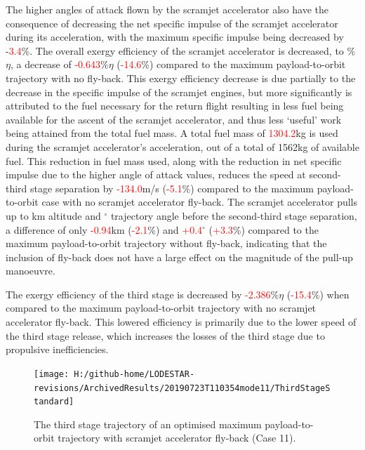 The higher angles of attack flown by the scramjet accelerator also have the consequence of decreasing the net specific impulse of the scramjet accelerator during its acceleration, with the maximum specific impulse being decreased by -\textcolor{red}{3.4}\%.
The overall exergy efficiency of the scramjet accelerator is decreased, to \secondExergyEffStandard\%$\eta$, a decrease of \textcolor{red}{-0.643}\%$\eta$ (\textcolor{red}{-14.6}\%) compared to the maximum payload-to-orbit trajectory with no fly-back. This exergy efficiency decrease is due partially to the decrease in the specific impulse of the scramjet engines, but more significantly is attributed to the fuel necessary for the return flight resulting in less fuel being available for the ascent of the scramjet accelerator, and thus less `useful' work being attained from the total fuel mass.
A total fuel mass of \textcolor{red}{1304.2}kg is used during the scramjet accelerator's acceleration, out of a total of 1562kg of available fuel. This reduction in fuel mass used, along with the reduction in net specific impulse due to the higher angle of attack values, reduces the speed at second-third stage separation by \textcolor{red}{-134.0}m/s (\textcolor{red}{-5.1}\%) compared to the maximum payload-to-orbit case with no scramjet accelerator fly-back. The scramjet accelerator pulls up to \secondthirdSeparationAltStandard km altitude and \secondthirdSeparationgammaStandard $^\circ$ trajectory angle before the second-third stage separation, a difference of only \textcolor{red}{-0.94}km (\textcolor{red}{-2.1}\%) and \textcolor{red}{+0.4}$^\circ$ (\textcolor{red}{+3.3}\%) compared to the maximum payload-to-orbit trajectory without fly-back, indicating that the inclusion of fly-back does not have a large effect on the magnitude of the pull-up manoeuvre. 

The exergy efficiency of the third stage is decreased by \textcolor{red}{-2.386}\%$\eta$ (\textcolor{red}{-15.4}\%) when compared to the maximum payload-to-orbit trajectory with no scramjet accelerator fly-back. This lowered efficiency is primarily due to the lower speed of the third stage release, which increases the losses of the third stage due to propulsive inefficiencies. 


\begin{figure}[ht!]%
\centering
\texttt{[image: H:/github-home/LODESTAR-revisions/ArchivedResults/20190723T110354mode11/ThirdStageStandard]}
\caption{The third stage trajectory of an optimised maximum payload-to-orbit trajectory with scramjet accelerator fly-back (Case 11). }
\label{fig:ThirdStageStandard}
\end{figure}


